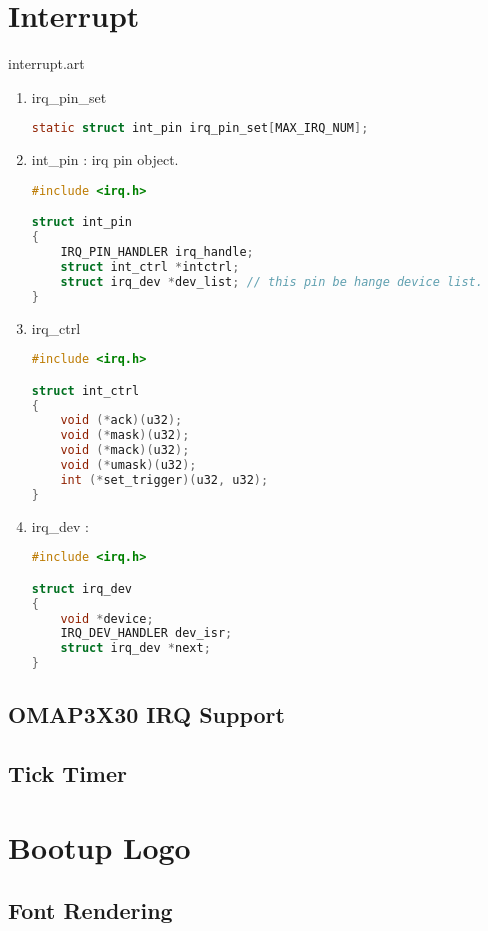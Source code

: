 \documentclass[a4paper,11pt]{book}
\begin{document}
\chapter{Interrupt}
 {interrupt.art}

\begin{enumerate}
\item irq\_pin\_set
\begin{lstlisting}[language=c, numbers=none]
	static struct int_pin irq_pin_set[MAX_IRQ_NUM];
\end{lstlisting}

\item int\_pin : irq pin object.
\begin{lstlisting}[language=c, numbers=none]
#include <irq.h>

struct int_pin
{
	IRQ_PIN_HANDLER irq_handle;
	struct int_ctrl *intctrl;
	struct irq_dev *dev_list; // this pin be hange device list.
}
\end{lstlisting}

\item irq\_ctrl
\begin{lstlisting}[language=c, numbers=none]
#include <irq.h>

struct int_ctrl
{
	void (*ack)(u32);
	void (*mask)(u32);
	void (*mack)(u32);
	void (*umask)(u32);
	int (*set_trigger)(u32, u32);
}
\end{lstlisting}

\item irq\_dev :
\begin{lstlisting}[language=c, numbers=none]
#include <irq.h>

struct irq_dev
{
	void *device;
	IRQ_DEV_HANDLER dev_isr;
	struct irq_dev *next;
}
\end{lstlisting}
\end{enumerate}

\section{OMAP3X30 IRQ Support}

\section{Tick Timer}

\chapter{Bootup Logo}

\section{Font Rendering}
\end{document}

